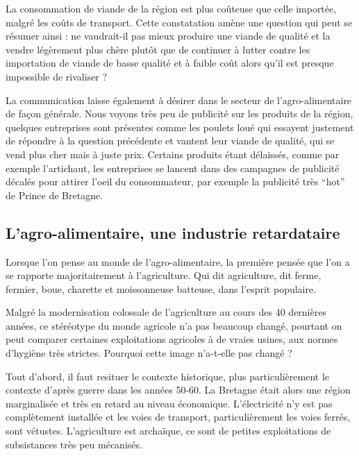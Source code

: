 \documentclass[a4paper,10pt]{report}
\begin{document}
			La consommation de viande de la région est plus coûteuse que celle importée, malgré les coûts de transport. Cette constatation amène une question qui peut se résumer ainsi : ne vaudrait-il pas mieux produire une viande de qualité et la vendre légèrement plus chère plutôt que de continuer à lutter contre les importation de viande de basse qualité et à faible coût alors qu’il est presque impossible de rivaliser ?
			
			La communication laisse également à désirer dans le secteur de l’agro-alimentaire de façon générale. Nous voyons très peu de publicité sur les produits de la région, quelques entreprises sont présentes comme les poulets loué qui essayent justement de répondre à la question précédente et vantent leur viande de qualité, qui se vend plus cher mais à juste prix.
			Certains produits étant délaissés, comme par exemple l’artichaut, les entreprises se lancent dans des campagnes de publicité décalés pour attirer l’oeil du consommateur, par exemple la publicité très “hot” de Prince de Bretagne.
			
		\subsection{L'agro-alimentaire, une industrie retardataire}
			Lorsque l’on pense au monde de l’agro-alimentaire, la première pensée que l’on a se rapporte majoritairement à l’agriculture. Qui dit agriculture, dit ferme, fermier, boue, charette et moissonneuse batteuse, dans l’esprit populaire.
			
			Malgré la modernisation colossale de l’agriculture au cours des 40 dernières années, ce stéréotype du monde agricole n’a pas beaucoup changé, pourtant on peut comparer certaines exploitations agricoles à de vraies usines, aux normes d’hygiène très strictes. Pourquoi cette image n’a-t-elle pas changé ?
			
			Tout d’abord, il faut resituer le contexte historique, plus particulièrement le contexte d’après guerre dans les années 50-60. La Bretagne était alors une région marginalisée et très en retard au niveau économique. L’électricité n’y est pas complètement installée et les voies de transport, particulièrement les voies ferrés, sont vétustes. L’agriculture est archaïque, ce sont de petites exploitations de subsistances très peu mécanisés.
			
\end{document}
